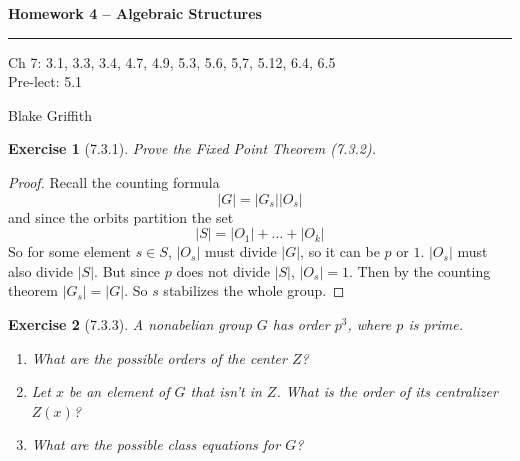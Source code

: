 \documentclass[12pt]{article}
\newtheorem*{exer}{Exercise}
\begin{document}
\textbf{Homework 4 -- Algebraic Structures} \\

\hrule

\begin{minipage}{.80\linewidth}
    \flushleft
    Ch 7: 3.1, 3.3, 3.4, 4.7, 4.9, 5.3, 5.6, 5,7, 5.12, 6.4, 6.5 \\
    Pre-lect: 5.1 \\
\end{minipage}
\begin{minipage}{.20\linewidth}
    \flushright
    Blake Griffith
\end{minipage}

\begin{exer}[7.3.1]

    Prove the Fixed Point Theorem (7.3.2).

\end{exer}

\begin{proof}

    Recall the counting formula
    \[
        |G| = |G_s||O_s|
    \]
    and since the orbits partition the set
    \[
        |S| = |O_1| + \dots + |O_k|
    \]
    So for some element $s \in S$, $|O_s|$ must divide $|G|$, so it can be
    $p$ or $1$. $|O_s|$ must also divide $|S|$. But since $p$ does not
    divide $|S|$, $|O_s| = 1$. Then by the counting theorem $|G_s| =
    |G|$. So $s$ stabilizes the whole group.

\end{proof}


\begin{exer}[7.3.3]

    A nonabelian group $G$ has order $p^3$, where $p$ is prime.

    \begin{enumerate}
        \item What are the possible orders of the center $Z$?

        \item Let $x$ be an element of $G$ that isn't in $Z$. What is
            the order of its centralizer $Z(x)$?

        \item What are the possible class equations for $G$?
    \end{enumerate}

\end{exer}
\end{document}

